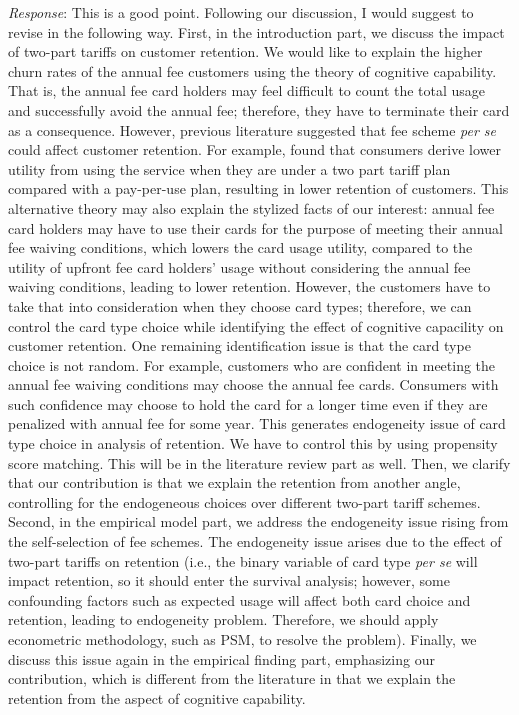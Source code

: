 \documentclass[titlepage,12pt,letterpaper]{article}
\numberwithin{equation}{section}
\begin{document}
\emph{Response}: This is a good point. Following our discussion, I would suggest to revise in the following way. First, in the introduction part, we discuss the impact of two-part tariffs on customer retention. We would like to explain the higher churn rates of the annual fee customers using the theory of cognitive capability. That is, the annual fee card holders may feel difficult to count the total usage and successfully avoid the annual fee; therefore, they have to terminate their card as a consequence. However, previous literature suggested that fee scheme \emph{per se} could affect customer retention. For example, \cite{Iyengar2011} found that consumers  derive  lower utility from  using  the  service  when  they  are  under a  two part tariff plan compared  with a pay-per-use plan,  resulting in lower retention of customers. This alternative theory may also explain the stylized facts of our interest: annual fee card holders may have to use their cards for the purpose of meeting their annual fee waiving conditions, which lowers the card usage utility, compared to the utility of upfront fee card holders' usage without considering the annual fee waiving conditions, leading to lower retention. However, the customers have to take that into consideration when they choose card types; therefore, we can control the card type choice while identifying the effect of cognitive capacility on customer retention. One remaining identification issue is that the card type choice is not random. For example, customers who are confident in meeting the annual fee waiving conditions may choose the annual fee cards. Consumers with such confidence may choose to hold the card for a longer time even if they are penalized with annual fee for some year. This generates endogeneity issue of card type choice in analysis of retention. We have to control this by using propensity score matching. This will be in the literature review part as well. Then, we clarify that our contribution is that we explain the retention from another angle, controlling for the endogeneous choices over different two-part tariff schemes. Second, in the empirical model part, we address the endogeneity issue rising from the self-selection of fee schemes. The endogeneity issue arises due to the effect of two-part tariffs on retention (i.e., the binary variable of card type \emph{per se} will impact retention, so it should enter the survival analysis; however, some confounding factors such as expected usage will affect both card choice and retention, leading to endogeneity problem. Therefore, we should apply econometric methodology, such as PSM, to resolve the problem). Finally, we discuss this issue again in the empirical finding part, emphasizing our contribution, which is different from the literature in that we explain the retention from the aspect of cognitive capability. 
\end{document}
